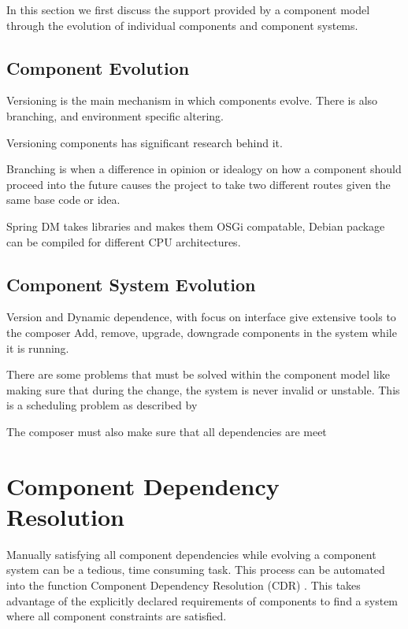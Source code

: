 
{}In this section we first discuss the support provided by a component model through the evolution of individual components and component systems.

\subsection{Component Evolution}
Versioning is the main mechanism in which components evolve.
There is also branching, and environment specific altering.

Versioning components has significant research behind it.

Branching is when a difference in opinion or idealogy on how a component should proceed into the future
causes the project to take two different routes given the same base code or idea.

Spring DM takes libraries and makes them OSGi compatable, 
Debian package can be compiled for different CPU architectures.


\subsection{Component System Evolution}
Version and Dynamic dependence, with focus on interface give extensive tools to the composer 
Add, remove, upgrade, downgrade components in the system while it is running.

There are some problems that must be solved within the component model like making sure that during the change,
the system is never invalid or unstable. 
This is a scheduling problem as described by %

The composer must also make sure that all dependencies are meet

\section{Component Dependency Resolution}
Manually satisfying all component dependencies while evolving a component system can be a tedious, time consuming task.
This process can be automated into the function Component Dependency Resolution (CDR) \cite{Jenson2010}.
This takes advantage of the explicitly declared requirements of components to find a system where all component constraints are satisfied.

